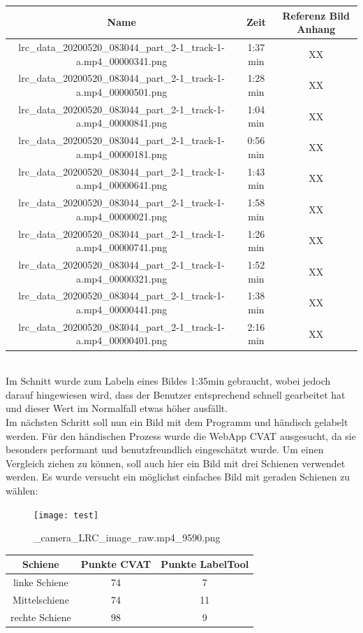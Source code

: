 \documentclass[11pt]{scrartcl}
\begin{document}
\noindent
\begin{tabular}[h]{c|c|c}
Name & Zeit & Referenz Bild Anhang \\
\hline
lrc\_data\_20200520\_083044\_part\_2-1\_track-1-a.mp4\_00000341.png &  1:37 min & XX \\
lrc\_data\_20200520\_083044\_part\_2-1\_track-1-a.mp4\_00000501.png &  1:28 min & XX \\
lrc\_data\_20200520\_083044\_part\_2-1\_track-1-a.mp4\_00000841.png &  1:04 min & XX \\
lrc\_data\_20200520\_083044\_part\_2-1\_track-1-a.mp4\_00000181.png &  0:56 min & XX \\
lrc\_data\_20200520\_083044\_part\_2-1\_track-1-a.mp4\_00000641.png &  1:43 min & XX \\
lrc\_data\_20200520\_083044\_part\_2-1\_track-1-a.mp4\_00000021.png &  1:58 min & XX \\
lrc\_data\_20200520\_083044\_part\_2-1\_track-1-a.mp4\_00000741.png &  1:26 min & XX \\
lrc\_data\_20200520\_083044\_part\_2-1\_track-1-a.mp4\_00000321.png &  1:52 min & XX \\
lrc\_data\_20200520\_083044\_part\_2-1\_track-1-a.mp4\_00000441.png &  1:38 min & XX \\
lrc\_data\_20200520\_083044\_part\_2-1\_track-1-a.mp4\_00000401.png &  2:16 min & XX \\
\end{tabular}
\\

\noindent
Im Schnitt wurde zum Labeln eines Bildes 1:35min gebraucht, wobei jedoch darauf hingewiesen wird, dass der Benutzer entsprechend schnell gearbeitet hat und dieser Wert im Normalfall etwas höher ausfällt.
\\

\noindent
Im nächsten Schritt soll nun ein Bild mit dem Programm und händisch gelabelt werden. Für den händischen Prozess wurde die WebApp CVAT ausgesucht, da sie besonders performant und benutzfreundlich eingeschätzt wurde. Um einen Vergleich ziehen zu können, soll auch hier ein Bild mit drei Schienen verwendet werden. Es wurde versucht ein möglichst einfaches Bild mit geraden Schienen zu wählen:
\begin{figure}[H]
  \texttt{[image: test]}
  \caption{\_camera\_LRC\_image\_raw.mp4\_9590.png}
\end{figure}
\begin{tabular}[h]{c|c|c}
Schiene & Punkte CVAT & Punkte LabelTool \\
\hline
linke Schiene & 74 &  7\\
Mittelschiene & 74 &  11\\
rechte Schiene & 98 & 9\\
\end{tabular}
\\
\end{document}
